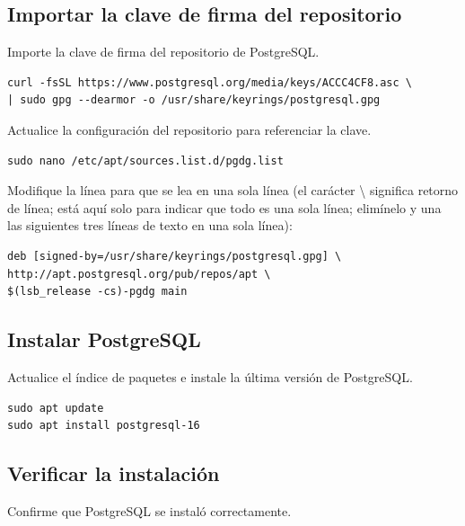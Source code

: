 \subsection{Importar la clave de firma del repositorio}
Importe la clave de firma del repositorio de PostgreSQL.

\begin{lstlisting}[basicstyle=\footnotesize\ttfamily]
curl -fsSL https://www.postgresql.org/media/keys/ACCC4CF8.asc \
| sudo gpg --dearmor -o /usr/share/keyrings/postgresql.gpg
\end{lstlisting}

Actualice la configuración del repositorio para referenciar la clave.

\begin{lstlisting}[basicstyle=\footnotesize\ttfamily]
sudo nano /etc/apt/sources.list.d/pgdg.list
\end{lstlisting}

Modifique la línea para que se lea en una sola línea (el carácter \textbackslash{}  significa retorno de línea; está aquí solo para indicar que todo es una sola línea; elimínelo y una las siguientes tres líneas de texto en una sola línea):

\begin{lstlisting}[basicstyle=\footnotesize\ttfamily]
deb [signed-by=/usr/share/keyrings/postgresql.gpg] \
http://apt.postgresql.org/pub/repos/apt \
$(lsb_release -cs)-pgdg main
\end{lstlisting}

\subsection{Instalar PostgreSQL}
Actualice el índice de paquetes e instale la última versión de PostgreSQL.

\begin{lstlisting}[basicstyle=\footnotesize\ttfamily]
sudo apt update
sudo apt install postgresql-16
\end{lstlisting}

\subsection{Verificar la instalación}
Confirme que PostgreSQL se instaló correctamente.

